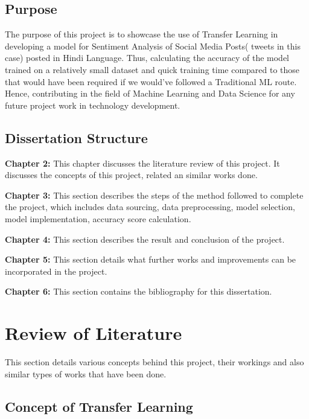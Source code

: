 \documentclass[a4paper, 12pt]{article}
\begin{document}
\begin{sloppypar}
\subsection{Purpose}

The purpose of this project is to showcase the use of Transfer Learning in developing a model for Sentiment Analysis of Social Media Posts( tweets in this case) posted in Hindi Language. Thus, calculating the accuracy of the model trained on a relatively small dataset and quick training time compared to those that would have been required if we would've followed a Traditional ML route. Hence, contributing in the field of Machine Learning and Data Science for any future project work in technology development.

\subsection{Dissertation Structure}
\textbf{Chapter 2:} This chapter discusses the literature review of this project. It discusses the concepts of this project, related an similar works done.

\textbf{Chapter 3:} This section describes the steps of the method followed to complete the project, which includes data sourcing, data preprocessing, model selection, model implementation, accuracy score calculation.

\textbf{Chapter 4:} This section describes the result and conclusion of the project.

\textbf{Chapter 5:} This section details what further works and improvements can be incorporated in the project.

\textbf{Chapter 6:} This section contains the bibliography for this dissertation.
\clearpage

\section {Review of Literature}

This section details various concepts behind this project, their workings and also similar types of works that have been done.

\subsection{Concept of Transfer Learning}


\end{sloppypar}
\end{document}
